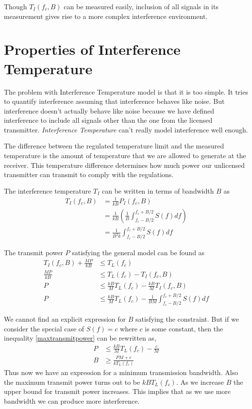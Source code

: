 \documentclass[12pt]{article}
\begin{document}
Though $T_I(f_c,B)$ can be measured easily, inclusion of all signals in its measurement gives rise to a more complex interference environment.


\section{Properties of Interference Temperature}

The problem with Interference Temperature model is that it is too simple. It tries to quantify interference assuming that interference behaves like noise. But interference doesn't actually behave like noise because we have defined interference to include all signals other than the one from the licensed transmitter. \emph{Interference Temperature} can't really model interference well enough.

The difference between the regulated temperature limit and the measured temperature is the amount of temperature that we are allowed to generate at the receiver. This temperature difference determines how much power our unlicensed transmitter can transmit to comply with the regulations.

The interference temperature $T_I$ can be written in terms of bandwidth $B$ as
\begin{align}
    T_I(f_c,B) & = \frac{1}{kB}P_I(f_c,B) \nonumber\\
    & = \frac{1}{kB}\left(\frac{1}{B}\int_{f_c-B/2}^{f_c+B/2}S(f)df\right) \nonumber\\
    & = \frac{1}{B^2k}\int_{f_c-B/2}^{f_c+B/2}S(f)df
\end{align}

The transmit power $P$ satisfying the general model can be found as
\begin{align}
    T_I(f_c,B) + \frac{MP}{kB} & \leq T_L(f_c) \nonumber \\
    \frac{MP}{kB} & \leq T_L(f_c) - T_I(f_c,B) \nonumber \\
    P & \leq \frac{kB}{M}T_L(f_c) - \frac{kB}{M}T_I(f_c,B) \nonumber \\
    P & \leq \frac{kB}{M}T_L(f_c) - \frac{1}{BM}\int_{f_c-B/2}^{f_c+B/2}S(f)df
    \label{maxtransmitpower}
\end{align}

We cannot find an explicit expression for $B$ satisfying the constraint. But if we consider the special case of $S(f) = c$ where $c$ is some constant, then the inequality \eqref{maxtransmitpower} can be rewritten as,
\begin{align}
    P & \leq \frac{kB}{M}T_L(f_c) - \frac{c}{M} \nonumber\\
    B & \geq \frac{PM + c}{kT_L(f_c)}
\end{align}
Thus now we have an expression for a minimum transmission bandwidth. Also the maximum transmit power turns out to be $kBT_L(f_c)$. As we increase $B$ the upper bound for transmit power increases. This implies that as we use more bandwidth we can produce more interference.
\end{document}
